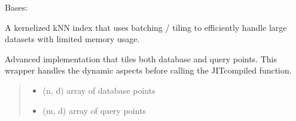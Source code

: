 \documentclass[letterpaper,10pt,english]{sphinxmanual}
\begin{document}
\begin{fulllineitems}
\label{\detokenize{api_reference:graphem.index.HPIndex}}
\pysigstartsignatures
{}
\pysigstopsignatures
\sphinxAtStartPar
Bases: 

\sphinxAtStartPar
A kernelized kNN index that uses batching / tiling to efficiently handle
large datasets with limited memory usage.

\begin{fulllineitems}
\label{\detokenize{api_reference:graphem.index.HPIndex.__init__}}
\pysigstartsignatures
{}
\pysigstopsignatures
\end{fulllineitems}


\begin{fulllineitems}
\label{\detokenize{api_reference:graphem.index.HPIndex.knn_tiled}}
\pysigstartsignatures
{}
\pysigstopsignatures
\sphinxAtStartPar
Advanced implementation that tiles both database and query points.
This wrapper handles the dynamic aspects before calling the JIT\sphinxhyphen{}compiled
function.
\begin{quote}\begin{description}
\begin{itemize}
\item {} 
\sphinxAtStartPar
{} \textendash{} (n, d) array of database points

\item {} 
\sphinxAtStartPar
{} \textendash{} (m, d) array of query points


\end{itemize}
\end{description}
\end{quote}
\end{fulllineitems}
\end{fulllineitems}
\end{document}
